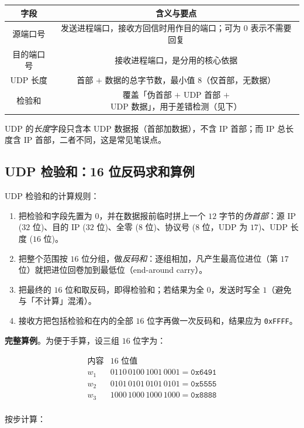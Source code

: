 \begin{tabulary}{\textwidth}{CC}
\toprule
字段 & 含义与要点 \\
\midrule
源端口号 & 发送进程端口，接收方回信时用作目的端口；可为 $0$ 表示不需要回复 \\
目的端口号 & 接收进程端口，是分用的核心依据 \\
UDP 长度 & 首部 $+$ 数据的总字节数，最小值 $8$（仅首部，无数据） \\
检验和 & 覆盖「伪首部 $+$ UDP 首部 $+$ UDP 数据」，用于差错检测（见下） \\
\bottomrule
\end{tabulary}

UDP 的\emph{长度}字段只含本 UDP 数据报（首部加数据），不含 IP 首部；而 IP 总长度含 IP 首部，二者不同，这是常见笔误点。

\subsection{UDP 检验和：16 位反码求和算例}

UDP 检验和的计算规则：

\begin{enumerate}
    \item 把检验和字段先置为 $0$，并在数据报前临时拼上一个 $12$ 字节的\emph{伪首部}：源 IP ($32$ 位)、目的 IP ($32$ 位)、全零 ($8$ 位)、协议号 ($8$ 位，UDP 为 $17$)、UDP 长度 ($16$ 位)。
    \item 把整个范围按 $16$ 位分组，做\emph{反码和}：逐组相加，凡产生最高位进位（第 $17$ 位）就把进位回卷加到最低位（end-around carry）。
    \item 把最终的 $16$ 位和取反码，即得检验和；若结果为全 $0$，发送时写全 $1$（避免与「不计算」混淆）。
    \item 接收方把包括检验和在内的全部 $16$ 位字再做一次反码和，结果应为 \texttt{0xFFFF}。
\end{enumerate}

\textbf{完整算例}。为便于手算，设三组 $16$ 位字为：

\[
\begin{array}{c|c}
\text{内容} & \text{16 位值} \\
\hline
w_1 & 0110\,0100\,1001\,0001 = \texttt{0x6491} \\
w_2 & 0101\,0101\,0101\,0101 = \texttt{0x5555} \\
w_3 & 1000\,1000\,1000\,1000 = \texttt{0x8888} \\
\end{array}
\]

按步计算：

